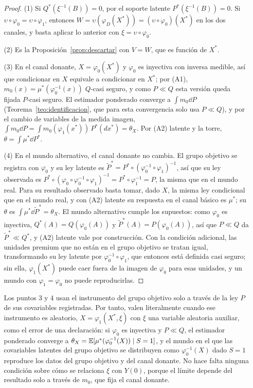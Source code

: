 \begin{proof}
(1) Si $Q^*(\xi^{-1}(B))=0$, por el soporte latente $P^*(\xi^{-1}(B))=0$. Si $\upsilon\circ\varphi_0=\upsilon\circ\varphi_1$, entonces $W=\upsilon(\varphi_D(X^*))=(\upsilon\circ\varphi_0)(X^*)$ en los dos canales, y basta aplicar lo anterior con $\xi=\upsilon\circ\varphi_0$.

(2) Es la Proposición~\ref{prop:descartar} con $V=W$, que es función de $X^*$.

(3) En el canal donante, $X=\varphi_0(X^*)$ y $\varphi_0$ es inyectiva con inversa medible, así que condicionar en $X$ equivale a condicionar en $X^*$; por (A1), $m_0(x)=\mu^*(\varphi_0^{-1}(x))$ $Q$-casi seguro, y como $P\ll Q$ esta versión queda fijada $P$-casi seguro. El estimador ponderado converge a $\int m_0\dd P$ (Teorema~\ref{teo:identificacion}, que para esta convergencia solo usa $P\ll Q$), y por el cambio de variables de la medida imagen, $\int m_0\dd P=\int m_0(\varphi_1(x^*))\,P^*(dx^*)=\theta_X$. Por (A2) latente y la torre, $\theta=\int\mu^*\dd P^*$.

(4) En el mundo alternativo, el canal donante no cambia. El grupo objetivo se registra con $\varphi_0$ y su ley latente es $\tilde P^*=P^*\circ(\varphi_0^{-1}\circ\varphi_1)^{-1}$, así que su ley observada es $P^*\circ(\varphi_0\circ\varphi_0^{-1}\circ\varphi_1)^{-1}=P^*\circ\varphi_1^{-1}=P$, la misma que en el mundo real. Para su resultado observado basta tomar, dado $X$, la misma ley condicional que en el mundo real, y con (A2) latente su respuesta en el canal básico es $\mu^*$; su $\theta$ es $\int\mu^*\dd\tilde P^*=\theta_X$. El mundo alternativo cumple los supuestos: como $\varphi_0$ es inyectiva, $Q^*(A)=Q(\varphi_0(A))$ y $\tilde P^*(A)=P(\varphi_0(A))$, así que $P\ll Q$ da $\tilde P^*\ll Q^*$, y (A2) latente vale por construcción. Con la condición adicional, las unidades premium que no están en el grupo objetivo se tratan igual, transformando su ley latente por $\varphi_0^{-1}\circ\varphi_1$, que entonces está definida casi seguro; sin ella, $\varphi_1(X^*)$ puede caer fuera de la imagen de $\varphi_0$ para esas unidades, y un mundo con $\varphi_1=\varphi_0$ no puede reproducirlas.
\end{proof}

\begin{observacion}\label{rem:stochastic}
Los puntos 3 y 4 usan el instrumento del grupo objetivo solo a través de la ley $P$ de sus covariables registradas. Por tanto, valen literalmente cuando ese instrumento es aleatorio, $X=\varphi_1(X^*,\xi)$ con $\xi$ una variable aleatoria auxiliar, como el error de una declaración: si $\varphi_0$ es inyectiva y $P\ll Q$, el estimador ponderado converge a $\theta_X=\mathbb{E}[\mu^*(\varphi_0^{-1}(X))\mid S=1]$, y el mundo en el que las covariables latentes del grupo objetivo se distribuyen como $\varphi_0^{-1}(X)$ dado $S=1$ reproduce los datos del grupo objetivo y del canal donante. No hace falta ninguna condición sobre cómo se relaciona $\xi$ con $Y(0)$, porque el límite depende del resultado solo a través de $m_0$, que fija el canal donante.
\end{observacion}

